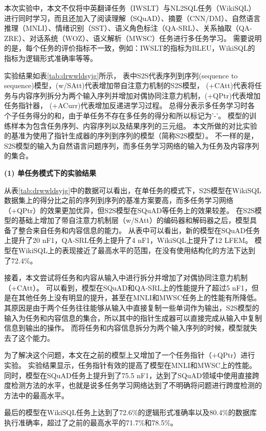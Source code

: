 本次实验中，本文不仅将中英翻译任务（IWSLT）与NL2SQL任务（WikiSQL）进行同时学习，而且还加入了阅读理解（SQuAD）、摘要（CNN/DM）、自然语言推理（MNLI）、情绪识别（SST）、语义角色标注（QA-SRL）、关系抽取（QA-ZRE）、对话系统（WOZ）、语义解析（MWSC）任务进行多任务学习。
需要说明的是，每个任务的评价指标不一致，例如：IWSLT的指标为BLEU，WikiSQL的指标为逻辑形式准确率等等。

实验结果如表\ref{tab:drwwldsyjg}所示，
表中S2S代表序列到序列(sequence to sequence)模型，(w/SAtt)代表增加带自注意力机制的S2S模型，
(+CAtt)代表将任务与内容序列拆分为两个输入序列并增加对偶协同注意力机制，(+QPtr)代表增加任务指针器， (+ACurr)代表增加反递进学习过程。
总得分表示多任务学习时各个子任务得分的和，由于单任务不存在多任务的得分和所以标记为’-’。
模型的训练样本为包含任务序列、内容序列以及结果序列的三元组。
本文所做的对比实验的基准为使用了指针生成器的序列到序列的模型（简称S2S模型）\cite{See2017Get}。
不一样的是，S2S模型的输入为自然语言问题序列，而多任务学习网络的输入为任务及内容序列的集合。

\textbf{(1) 单任务模式下的实验结果}

从表\ref{tab:drwwldsyjg}中的数据可以看出，在单任务的模式下，S2S模型在WikiSQL数据集上的得分比之前的序列到序列的基准方案要高，而多任务学习网络（+QPtr）的效果更加优异，但S2S模型在SQuAD等任务上的效果较差。
在S2S模型的基础上增加了带自注意力机制层（w/SAtt）的编码器和解码器之后\cite{vaswani2017attention}，模型具备了整合来自任务和内容信息的能力。
从表中可以看出，新的模型在SQuAD任务上提升了20 nF1，QA-SRL任务上提升了4 nF1，WikiSQL上提升了12 LFEM。
模型在WikiSQL上的表现接近了最高水平的范围，在没有使用结构化的方法\cite{dong2018coarse,huang2018natural,yu2018typesql}下达到了72.4\%。

接着，本文尝试将任务和内容从输入中进行拆分并增加了对偶协同注意力机制（+CAtt）。
可以看到，模型在SQuAD和QA-SRL上的性能提升了超过5 nF1，但是在其他任务上没有明显的提升，甚至在MNLI和MWSC任务上的性能有所降低。
其原因是由于两个任务往往能够从输入中直接复制一些单词作为输出，S2S模型的输入为任务和内容信息的集合，所以其中的指针生成器可以直接完成从输入中复制信息到输出的操作。
而将任务和内容信息拆分为两个输入序列的时候，模型就失去了这个能力。

为了解决这个问题，本文在之前的模型上又增加了一个任务指针（+QPtr）进行实验。
实验结果显示，任务指针有效的提高了模型在MNLI和MWSC上的性能。
同时，模型在SQuAD任务上提升到了75.5 nF1，达到了SQuAD领域中使用直接跨度检测方法的水平，也就是说多任务学习网络达到了不明确将问题进行跨度检测的方法中的最高水平。

最后的模型在WikiSQL任务上达到了72.6\%的逻辑形式准确率以及80.4\%的数据库执行准确率，超过了之前的最高水平\cite{dong2018coarse}的71.7\%和78.5\%。

